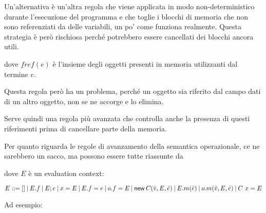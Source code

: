 \begin{prooftree}
\end{prooftree}

\noindent Un'alternativa è un'altra regola che viene applicata in modo non-deterministico durante l'esecuzione del programma e che toglie i blocchi di memoria che non sono referenziati da delle variabili, un po' come funziona realmente. Questa strategia è però rischiosa perché potrebbero essere cancellati dei blocchi ancora utili.

\begin{prooftree}
\end{prooftree}

\noindent dove $fref(e)$ è l'insieme degli oggetti presenti in memoria utilizzanti dal termine $e$. 

Questa regola però ha un problema, perché un oggetto sia riferito dal campo dati di un altro oggetto, non se ne accorge e lo elimina.

Serve quindi una regola più avanzata che controlla anche la presenza di questi riferimenti prima di cancellare parte della memoria.

\begin{prooftree}
\end{prooftree}

\noindent Per quanto riguarda le regole di avanzamento della semantica operazionale, ce ne sarebbero un sacco, ma possono essere tutte riassunte da

\begin{prooftree}
\end{prooftree}

\noindent dove $E$ è un evaluation context:

$$
E ::= [] \vbar E.f \vbar E;e \vbar x = E \vbar E.f = e \vbar o.f = E \vbar \new{C}{\tilde{v}, E, \tilde{e}} \vbar E.m(\tilde{e}) \vbar o.m(\tilde{v}, E, \tilde{e}) \vbar C \ x = E
$$

\noindent Ad esempio:

